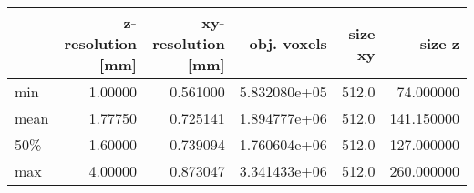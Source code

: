 \begin{tabular}{lrrrrr}
\toprule
{} &  z-resolution [mm] &  xy-resolution [mm] &   obj. voxels &  size xy &      size z \\
\midrule
min   &            1.00000 &            0.561000 &  5.832080e+05 &    512.0 &   74.000000 \\
mean  &            1.77750 &            0.725141 &  1.894777e+06 &    512.0 &  141.150000 \\
50\%   &            1.60000 &            0.739094 &  1.760604e+06 &    512.0 &  127.000000 \\
max   &            4.00000 &            0.873047 &  3.341433e+06 &    512.0 &  260.000000 \\
\bottomrule
\end{tabular}
